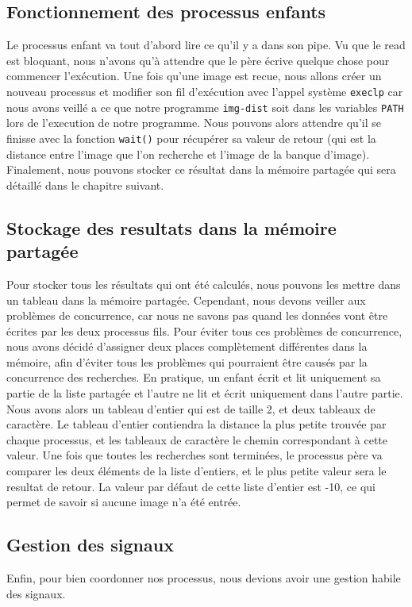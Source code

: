 \documentclass[french]{article}
\begin{document}
\subsection{Fonctionnement des processus enfants}
Le processus enfant va tout d'abord lire ce qu'il y a dans son pipe. Vu que le read est bloquant, nous n'avons qu'à attendre que le père écrive quelque chose pour 
commencer l'exécution. Une fois qu'une image est recue, nous allons créer un nouveau processus et modifier son fil d'exécution avec l'appel système \texttt{execlp} 
car nous avons veillé a ce que notre programme \texttt{img-dist} soit dans les variables \texttt{PATH} lors de l'execution de notre programme. Nous pouvons alors 
attendre qu'il se finisse avec la fonction \texttt{wait()} pour récupérer sa valeur de retour (qui est la distance entre l'image que l'on recherche et l'image 
de la banque d'image). Finalement, nous pouvons stocker ce résultat dans la mémoire partagée qui sera détaillé dans le chapitre suivant. 

\subsection{Stockage des resultats dans la mémoire partagée}
Pour stocker tous les résultats qui ont été calculés, nous pouvons les mettre dans un tableau dans la mémoire partagée. Cependant, nous devons veiller aux problèmes 
de concurrence, car nous ne savons pas quand les données vont être écrites par les deux processus fils. Pour éviter tous ces problèmes de concurrence, nous avons décidé
d'assigner deux places complètement différentes dans la mémoire, afin d'éviter tous les problèmes qui pourraient être causés par la concurrence des recherches. En pratique,
un enfant écrit et lit uniquement sa partie de la liste partagée et l'autre ne lit et écrit uniquement dans l'autre partie. Nous avons alors un tableau d'entier qui est 
de taille 2, et deux tableaux de caractère. Le tableau d'entier contiendra la distance la plus petite trouvée par chaque processus, et les tableaux de caractère le chemin 
correspondant à cette valeur. Une fois que toutes les recherches sont terminées, le processus père va comparer les deux éléments de la liste d'entiers, et le plus petite 
valeur sera le resultat de retour. La valeur par défaut de cette liste d'entier est -10, ce qui permet de savoir si aucune image n'a été entrée.  

\subsection{Gestion des signaux}
Enfin, pour bien coordonner nos processus, nous devions avoir une gestion habile des signaux. 
\end{document}
